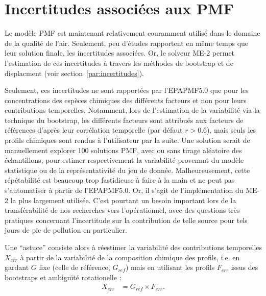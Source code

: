 \section{Incertitudes associées aux PMF}%
\label{sub:incertitudes_associées}

\begin{tcolorbox}[colback=red!5!white,colframe=Melon,title=Note]
\end{tcolorbox}

Le modèle PMF est maintenant relativement couramment utilisé dans le domaine de la
qualité de l'air. Seulement, peu d'études rapportent en même temps que leur solution
finale, les incertitudes associées. Or, le solveur ME-2 permet l'estimation de ces
incertitudes à travers les méthodes de bootstrap et de displacment (voir
section~\ref{par:incertitudes}).

Seulement, ces incertitudes ne sont rapportées par l'EPAPMF5.0 que pour les concentrations
des espèces chimiques des différents facteurs et non pour leurs contributions temporelles.
Notamment, lors de l'estimation de la variabilité via la technique du bootstrap, les différents facteurs
sont attribués aux facteurs de références d'après leur corrélation temporelle (par défaut
$r > 0.6$), mais seuls les profils chimiques sont rendus à l'utilisateur par la suite.
Une solution serait de manuellement explorer 100 solutions PMF, avec ou sans tirage
aléatoire des échantillons, pour estimer respectivement la variabilité provenant du modèle
statistique ou de la représentativité du jeu de donnée. Malheureusement, cette
répétabilité est beaucoup trop fastidieuse à faire à la main et ne peut pas s'automatiser à
partir de l'EPAPMF5.0. Or, il s'agit de l'implémentation du ME-2 la plus largement
utilisée. C'est pourtant un besoin important lors de la transférabilité de nos recherches
vers l'opérationnel, avec des questions très pratiques concernant l'incertitude
sur la contribution de telle source pour tels jours de pic de pollution en particulier.

Une ``astuce'' consiste alors à réestimer la variabilité des contributions temporelles
$X_{err}$ à partir de la variabilité de la composition chimique des profils, i.e. en gardant
$G$ fixe (celle de référence, $G_{ref}$) mais en utilisant les profils $F_{err}$ issus
des bootstraps et ambiguïté rotationelle :
\begin{align}
    \label{eq:hack_unc}
    X_{err} &= G_{ref} \times F_{err}.
\end{align}

